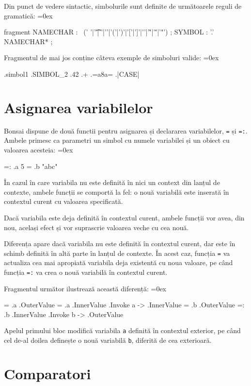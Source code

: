 \documentclass[12pt,a4paper]{memoir}
\renewcommand{\c}{\texttt}
\newenvironment{code}
{
\definecolor{shadecolor}{gray}{0.91}
\topsep=0ex
\relax
\shaded
\verbatim
}
{
\endverbatim
\endshaded
}
\begin{document}
Din punct de vedere sintactic, simbolurile sunt definite de următoarele reguli de gramatică:
\begin{code}
fragment NAMECHAR
    :   ~(' '|'\t'|'{'|'}'|'('|')'|'['|']'|'\n'|'\r'|'\''|'"')
    ;
SYMBOL
    :   '.' NAMECHAR*
    ;
\end{code}
Fragmentul de mai jos conține câteva exemple de simboluri valide:
\begin{code}
.simbol1
.SIMBOL_2
.42
.+
.=a8a=
.|CASE|
\end{code}

\section{Asignarea variabilelor}

Bonsai dispune de două functii pentru asignarea și declararea variabilelor, \c{=} și \c{=:}. Ambele primesc ca parametri un simbol cu numele variabilei și un obiect cu valoarea acesteia:
\begin{code}
=: .a 5
= .b "abc"
\end{code}

În cazul în care variabila nu este definită în nici un context din lanțul de contexte, ambele funcții se comportă la fel: o nouă variabilă este inserată în contextul curent cu valoarea specificată. 

Dacă variabila este deja definită în contextul curent, ambele funcții vor avea, din nou, același efect și vor suprascrie valoarea veche cu cea nouă.

Diferența apare dacă variabila nu este definită în contextul curent, dar este în schimb definită în altă parte în lanțul de contexte. În acest caz, funcția \c{=} va actualiza cea mai apropiată variabila deja existentă cu noua valoare, pe când funcția \c{=:} va crea o nouă variabilă în contextul curent. 

Fragmentul următor ilustrează această diferență:
\begin{code}
= .a .OuterValue
{ = .a .InnerValue } .Invoke
a
  -> .InnerValue
= .b .OuterValue
{ =: .b .InnerValue } .Invoke
b
  -> .OuterValue
\end{code}
Apelul primului bloc modifică variabila \c{a} definită în contextul exterior, pe când cel de-al doilea definește o nouă variabilă \c{b}, diferită de cea exterioară.

\section{Comparatori}
\end{document}
